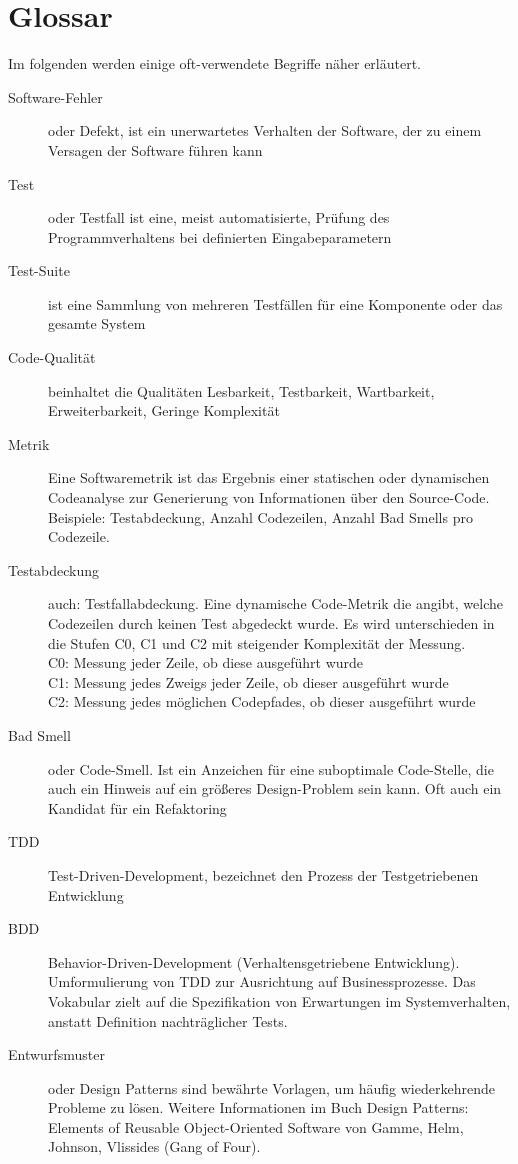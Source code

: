  \section*{Glossar}
Im folgenden werden einige oft-verwendete Begriffe näher erläutert.
\begin{description}
 \item[Software-Fehler] oder Defekt, ist ein unerwartetes Verhalten der Software, der zu einem Versagen der Software führen kann
 \item[Test] oder Testfall ist eine, meist automatisierte, Prüfung des Programmverhaltens bei definierten Eingabeparametern
 \item[Test-Suite] ist eine Sammlung von mehreren Testfällen für eine Komponente oder das gesamte System
 \item[Code-Qualität] beinhaltet die Qualitäten Lesbarkeit, Testbarkeit, Wartbarkeit, Erweiterbarkeit, Geringe Komplexität
 \item[Metrik] Eine Softwaremetrik ist das Ergebnis einer statischen oder dynamischen Codeanalyse zur Generierung von Informationen über den Source-Code. Beispiele: Testabdeckung, Anzahl Codezeilen, Anzahl Bad Smells pro Codezeile.
 
 \item[Testabdeckung] auch: Testfallabdeckung. Eine dynamische Code-Metrik die angibt, welche Codezeilen durch keinen Test abgedeckt wurde. Es wird unterschieden in die Stufen C0, C1 und C2 mit steigender Komplexität der Messung.\\
 C0: Messung jeder Zeile, ob diese ausgeführt wurde\\
 C1: Messung jedes Zweigs jeder Zeile, ob dieser ausgeführt wurde\\
 C2: Messung jedes möglichen Codepfades, ob dieser ausgeführt wurde
 \item[Bad Smell] oder Code-Smell. Ist ein Anzeichen für eine suboptimale Code-Stelle, die auch ein Hinweis auf ein größeres Design-Problem sein kann. Oft auch ein Kandidat für ein Refaktoring
 \item[TDD] Test-Driven-Development, bezeichnet den Prozess der Testgetriebenen Entwicklung
 \item[BDD] Behavior-Driven-Development (Verhaltensgetriebene Entwicklung). Umformulierung von TDD zur Ausrichtung auf Businessprozesse. Das Vokabular zielt auf die Spezifikation von Erwartungen im Systemverhalten, anstatt Definition nachträglicher Tests.
 \item[Entwurfsmuster] oder Design Patterns sind bewährte Vorlagen, um häufig wiederkehrende Probleme zu lösen. Weitere Informationen im Buch Design Patterns: Elements of Reusable Object-Oriented Software von Gamme, Helm, Johnson, Vlissides (Gang of Four).
\end{description}
\newpage